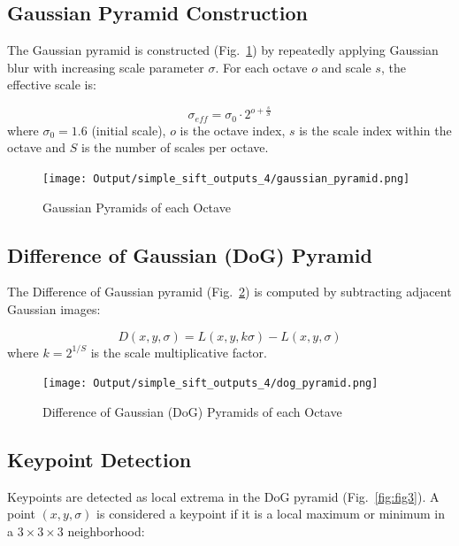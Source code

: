\documentclass[12pt,a4paper]{article}
\begin{document}
\subsection{Gaussian Pyramid Construction}

The Gaussian pyramid is constructed (Fig.~\ref{fig:fig1}) by repeatedly applying Gaussian blur with increasing scale parameter $\sigma$. For each octave $o$ and scale $s$, the effective scale is:

\begin{equation}
\sigma_{eff} = \sigma_0 \cdot 2^{o + \frac{s}{S}}
\end{equation}
where $\sigma_0 = 1.6$ (initial scale), $o$ is the octave index, $s$ is the scale index within the octave and $S$ is the number of scales per octave.

\begin{figure}[!ht]
    \centering
    \texttt{[image: Output/simple\_sift\_outputs\_4/gaussian\_pyramid.png]}
    \caption{Gaussian Pyramids of each Octave}
    \label{fig:fig1}
\end{figure}

\subsection{Difference of Gaussian (DoG) Pyramid}

The Difference of Gaussian pyramid (Fig.~\ref{fig:fig2}) is computed by subtracting adjacent Gaussian images:

\begin{equation}
D(x,y,\sigma) = L(x,y,k\sigma) - L(x,y,\sigma)
\end{equation}
where $k = 2^{1/S}$ is the scale multiplicative factor.

\begin{figure}[!ht]
    \centering
    \texttt{[image: Output/simple\_sift\_outputs\_4/dog\_pyramid.png]}
    \caption{Difference of Gaussian (DoG) Pyramids of each Octave}
    \label{fig:fig2}
\end{figure}

\subsection{Keypoint Detection}

Keypoints are detected as local extrema in the DoG pyramid (Fig.~\ref{fig:fig3}). A point $(x,y,\sigma)$ is considered a keypoint if it is a local maximum or minimum in a $3 \times 3 \times 3$ neighborhood:
\end{document}
